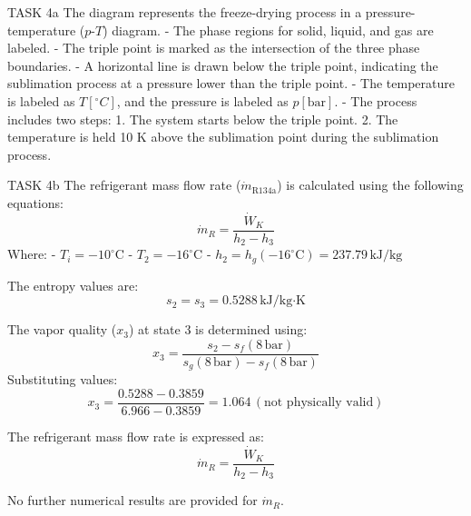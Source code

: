TASK 4a  
The diagram represents the freeze-drying process in a pressure-temperature (\(p\)-\(T\)) diagram.  
- The phase regions for solid, liquid, and gas are labeled.  
- The triple point is marked as the intersection of the three phase boundaries.  
- A horizontal line is drawn below the triple point, indicating the sublimation process at a pressure lower than the triple point.  
- The temperature is labeled as \(T [^\circ C]\), and the pressure is labeled as \(p [\text{bar}]\).  
- The process includes two steps:  
  1. The system starts below the triple point.  
  2. The temperature is held 10 K above the sublimation point during the sublimation process.  

TASK 4b  
The refrigerant mass flow rate (\(\dot{m}_{\text{R134a}}\)) is calculated using the following equations:  
\[
\dot{m}_R = \frac{\dot{W}_K}{h_2 - h_3}
\]  
Where:  
- \(T_i = -10^\circ\text{C}\)  
- \(T_2 = -16^\circ\text{C}\)  
- \(h_2 = h_g(-16^\circ\text{C}) = 237.79 \, \text{kJ/kg}\)  

The entropy values are:  
\[
s_2 = s_3 = 0.5288 \, \text{kJ/kg·K}
\]  

The vapor quality (\(x_3\)) at state 3 is determined using:  
\[
x_3 = \frac{s_2 - s_f(8 \, \text{bar})}{s_g(8 \, \text{bar}) - s_f(8 \, \text{bar})}
\]  
Substituting values:  
\[
x_3 = \frac{0.5288 - 0.3859}{6.966 - 0.3859} = 1.064 \, (\text{not physically valid})
\]  

The refrigerant mass flow rate is expressed as:  
\[
\dot{m}_R = \frac{\dot{W}_K}{h_2 - h_3}
\]  

No further numerical results are provided for \(\dot{m}_R\).